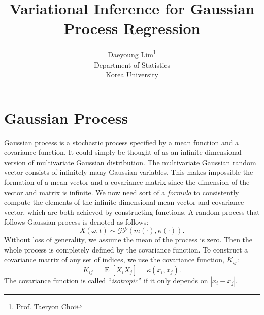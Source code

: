 \documentclass[11pt]{article}
\newcommand{\opn}{\operatorname}
\begin{document}
\nocite{*}

\title{Variational Inference for Gaussian Process Regression}

\author{Daeyoung Lim\thanks{Prof. Taeryon Choi} \\
Department of Statistics \\
Korea University}

\maketitle

\section{Gaussian Process}
Gaussian process is a stochastic process specified by a mean function and a covariance function. It could simply be thought of as an infinite-dimensional version of multivariate Gaussian distribution. The multivariate Gaussian random vector consists of infinitely many Gaussian variables. This makes impossible the formation of a mean vector and a covariance matrix since the dimension of the vector and matrix is infinite. We now need sort of a \emph{formula} to consistently compute the elements of the infinite-dimensional mean vector and covariance vector, which are both achieved by constructing functions. A random process that follows Gaussian process is denoted as follows:
$$
  X\left(\omega, t\right) \sim \mathcal{GP}\left(m\left(\cdot \right), \kappa \left(\cdot \right) \right).
$$
Without loss of generality, we assume the mean of the process is zero. Then the whole process is completely defined by the covariance function. To construct a covariance matrix of any set of indices, we use the covariance function, $K_{ij}$:
$$
  K_{ij} = \opn{E}\left[X_{i}X_{j} \right]=\kappa \left(x_{i}, x_{j}\right).
$$
The covariance function is called ``\emph{isotropic}'' if it only depends on $\left|x_{i}-x_{j}\right|$.
\end{document}
